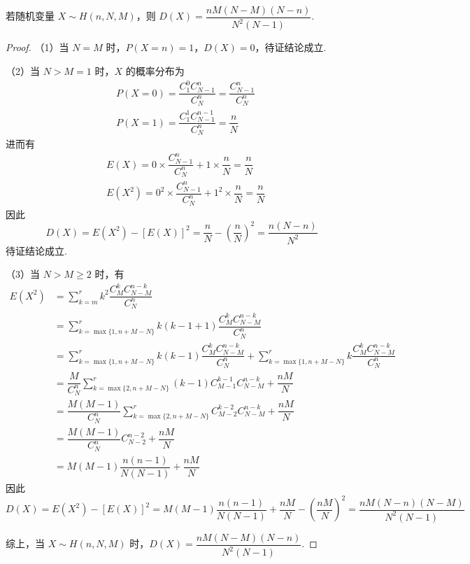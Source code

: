 \begin{conclusion}
    \indent 若随机变量 $X \sim H(n,N,M)$，则 $D(X) = \dfrac{nM(N-M)(N-n)}{N^2 (N-1)}$.
\end{conclusion}

\begin{proof}
    （1）当 $N=M$ 时，$P(X=n)=1$，$D(X)=0$，待证结论成立.

    （2）当 $N>M=1$ 时，$X$ 的概率分布为
    $$
    \begin{aligned}
        & P(X=0) = \dfrac{C_1^0 C_{N-1}^n}{C_N^n} = \dfrac{C_{N-1}^n}{C_N^n} \\
        & P(X=1) = \dfrac{C_1^1 C_{N-1}^{n-1}}{C_N^n} = \dfrac{n}{N}
    \end{aligned}
    $$
    进而有
    $$
    \begin{aligned}
        & E(X) = 0 \times \dfrac{C_{N-1}^n}{C_N^n} + 1 \times \dfrac{n}{N} = \dfrac{n}{N} \\
        & E(X^2) = 0^2 \times \dfrac{C_{N-1}^n}{C_N^n} + 1^2 \times \dfrac{n}{N} = \dfrac{n}{N}
    \end{aligned}
    $$
    因此
    $$
    D(X) = E(X^2) - [E(X)]^2 = \dfrac{n}{N} - \left( \dfrac{n}{N} \right)^2 = \dfrac{n(N-n)}{N^2}
    $$
    待证结论成立.
    
    （3）当 $N > M \geqslant 2$ 时，有
    $$
    \begin{aligned}
        E(X^2) &= \sum_{k=m}^{r} k^2 \dfrac{C_M^k C_{N-M}^{n-k}}{C_N^n} \\
        &= \sum_{k=\max\{ 1, n+M-N \}}^{r} k(k-1+1) \dfrac{C_M^k C_{N-M}^{n-k}}{C_N^n} \\
        &= \sum_{k=\max\{ 1, n+M-N \}}^{r} k(k-1) \dfrac{C_M^k C_{N-M}^{n-k}}{C_N^n} + \sum_{k=\max\{ 1, n+M-N \}}^{r} k \dfrac{C_M^k C_{N-M}^{n-k}}{C_N^n} \\
        &= \dfrac{M}{C_N^n} \sum_{k=\max\{ 2, n+M-N \}}^{r} (k-1) C_{M-1}^{k-1} C_{N-M}^{n-k} + \dfrac{nM}{N} \\
        &= \dfrac{M(M-1)}{C_N^n} \sum_{k=\max\{ 2, n+M-N \}}^{r} C_{M-2}^{k-2} C_{N-M}^{n-k} + \dfrac{nM}{N} \\
        &= \dfrac{M(M-1)}{C_N^n} C_{N-2}^{n-2} + \dfrac{nM}{N} \\
        &= M(M-1) \dfrac{n(n-1)}{N(N-1)} + \dfrac{nM}{N}
    \end{aligned}
    $$
    因此
    $$
    D(X) = E(X^2) - [E(X)]^2 = M(M-1) \dfrac{n(n-1)}{N(N-1)} + \dfrac{nM}{N} - \left( \dfrac{nM}{N} \right)^2 = \dfrac{nM(N-n)(N-M)}{N^2 (N-1)}
    $$

    综上，当 $X \sim H(n,N,M)$ 时，$D(X) = \dfrac{nM(N-M)(N-n)}{N^2 (N-1)}$.
\end{proof}

